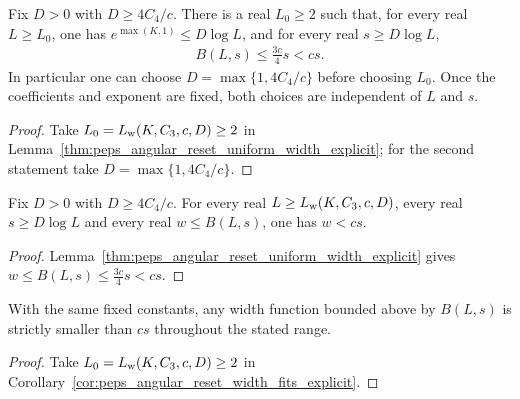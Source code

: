 \begin{lemma}
    \label{thm:peps_angular_reset_uniform_width}
    \leanok
    Fix $D>0$ with $D\ge4C_4/c$. There is a real $L_0\ge2$ such that,
    for every real $L\ge L_0$, one has $e^{\max(K,1)}\le D\log L$,
    and for every real $s\ge D\log L$,
    \begin{align}
        B(L,s)\le\frac{3c}{4}s<cs.
        \label{eq:peps_angular_reset_uniform_width}
    \end{align}
    In particular one can choose $D=\max\{1,4C_4/c\}$ before choosing
    $L_0$. Once the coefficients and exponent are fixed, both choices are independent
    of $L$ and $s$.
\end{lemma}
\begin{proof}
    \leanok
    Take $L_0=L_{\rm w}(K,C_3,c,D)\ge2$ in
    Lemma~\ref{thm:peps_angular_reset_uniform_width_explicit}; for the second
    statement take $D=\max\{1,4C_4/c\}$.
\end{proof}

\begin{corollary}
    \label{cor:peps_angular_reset_width_fits_explicit}
    \leanok
    Fix $D>0$ with $D\ge4C_4/c$. For every real $L\ge L_{\rm w}(K,C_3,c,D)$, every real
    $s\ge D\log L$ and every real $w\le B(L,s)$, one has $w<cs$.
\end{corollary}
\begin{proof}
    \leanok
    Lemma~\ref{thm:peps_angular_reset_uniform_width_explicit} gives
    $w\le B(L,s)\le\frac{3c}{4}s<cs$.
\end{proof}

\begin{corollary}
    \label{cor:peps_angular_reset_width_fits}
    \leanok
    With the same fixed constants, any width function bounded above by
    $B(L,s)$ is strictly smaller than $cs$ throughout the stated range.
\end{corollary}
\begin{proof}
    \leanok
    Take $L_0=L_{\rm w}(K,C_3,c,D)\ge2$ in
    Corollary~\ref{cor:peps_angular_reset_width_fits_explicit}.
\end{proof}
